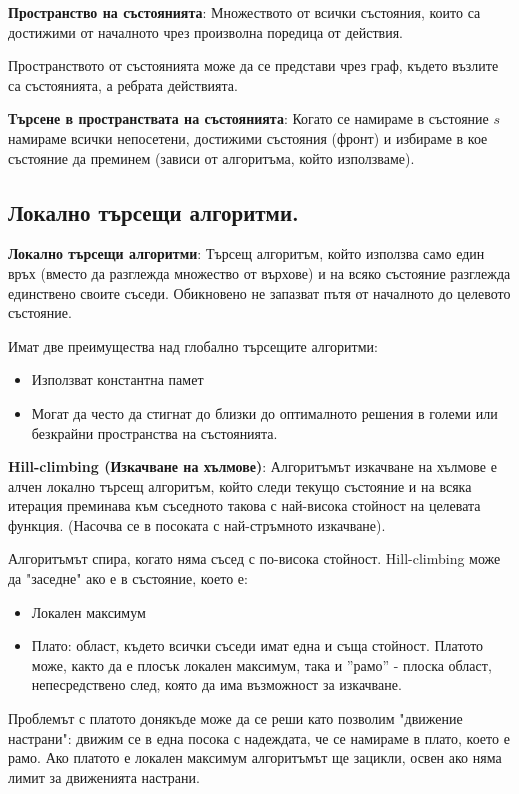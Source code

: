 \documentclass{article}
\renewcommand{\\}{\newline}
\begin{document}
\textbf{Пространство на състоянията}: Множеството от всички състояния, които са достижими от началното чрез произволна поредица от действия.

Пространството от състоянията може да се представи чрез граф, където възлите са състоянията, а ребрата действията.

\textbf{Търсене в пространствата на състоянията}: Когато се намираме в състояние \(s\) намираме всички непосетени, достижими състояния (фронт) и избираме в кое състояние да преминем (зависи от алгоритъма, който използваме). 

\subsection{Локално търсещи алгоритми.}

\textbf{Локално търсещи алгоритми}: Търсещ алгоритъм, който използва само един връх (вместо да разглежда множество от върхове) и на всяко състояние разглежда единствено своите съседи. Обикновено не запазват пътя от началното до целевото състояние. 

Имат две преимущества над глобално търсещите алгоритми: \begin{itemize}
    \item Използват константна памет
    \item Могат да често да стигнат до близки до оптималното решения в големи или безкрайни пространства на състоянията.
\end{itemize}

\textbf{Hill-climbing (Изкачване на хълмове)}: Алгоритъмът изкачване на хълмове е алчен локално търсещ алгоритъм, който следи текущо състояние и на всяка итерация преминава към съседното такова с най-висока стойност на целевата функция. (Насочва се в посоката с най-стръмното изкачване). 

Алгоритъмът спира, когато няма съсед с по-висока стойност. Hill-climbing може да "заседне" ако е в състояние, което е: \begin{itemize}
    \item Локален максимум
    \item Плато: област, където всички съседи имат една и съща стойност. Платото може, както да е плосък локален максимум, така и ''рамо'' - плоска област, непесредствено след, която да има възможност за изкачване.
\end{itemize}

Проблемът с платото донякъде може да се реши като позволим "движение настрани": движим се в една посока с надеждата, че се намираме в плато, което е рамо. Ако платото е локален максимум алгоритъмът ще зацикли, освен ако няма лимит за движенията настрани. 
\end{document}
